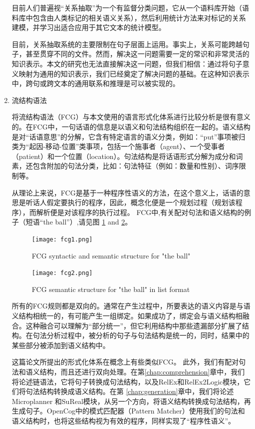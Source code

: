 \begin{enumerate}
目前人们普遍视“关系抽取”为一个有监督分类问题，它从一个语料库开始（语料库中包含由人类标记的相关语义关系），然后利用统计方法来对标记的关系建模，并学习出适合应用于其它文本的统计模型。

目前，关系抽取系统的主要限制在句子层面上运用。事实上，关系可能跨越句子，甚至贯穿不同的文件。然而，解决这一问题需要一定的常识和非常灵活的知识表示。本文的研究也无法直接解决这一问题，但我们相信：通过将句子意义映射为通用的知识表示，我们已经奠定了解决问题的基础。在这种知识表示中，跨句或跨文本的通用联系和推理是可以被实现的。

\item{流结构语法}


将流结构语法（FCG）与本文使用的语言形式化体系进行比较分析是很有意义的。在FCG中，一句话语的信息是以语义和句法结构组织在一起的。语义结构是对“话语意思”的分解，它含有特定语言的语义分类，例如：“put”事项被归类为“起因-移动-位置”类事项，包括一个施事者（agent）、一个受事者（patient）和一个位置（location）。句法结构是将话语形式分解为成分和词素，还包含附加的句法分类，比如：句法特征（例如：数量和性别）、词序限制等。


从理论上来说，FCG是基于一种程序性语义的方法，在这个意义上，话语的意思是听话人假定要执行的程序，因此，概念化便是一个规划过程（规划该程序），而解析便是对该程序的执行过程。
FCG中,有关配对句法和语义结构的例子（短语“the ball”）,请见图 \ref{fig:fcg1} and \ref{fig:fcg2}。

\begin{figure}[htb]
\centering
\texttt{[image: fcg1.png]}
\caption{ FCG syntactic and semantic structure for "the ball" }
\label{fig:fcg1}
\end{figure}

\begin{figure}[htb]
\centering
\texttt{[image: fcg2.png]}
\caption{ FCG semantic structure for "the ball" in  list format}
\label{fig:fcg2}
\end{figure}


所有的FCG规则都是双向的。通常在产生过程中，所要表达的语义内容是与语义结构相统一的，有可能产生一组绑定。如果成功了，绑定会与语义结构相融合。这种融合可以理解为“部分统一”，但它利用结构中那些遗漏部分扩展了结构。在句法分析过程中，被分析的句子与句法结构是统一的，同时，结果中的某些部分被添加到语义结构中。


这篇论文所提出的形式化体系在概念上有些类似FCG。 此外，我们有配对句法和语义结构，而且还进行双向处理。在第\ref{chap:comprehension}章中，我们将论述链语法，它将句子转换成句法结构，以及RelEx和RelEx2Logic模块，它们将句法结构转换成语义结构。在第 \ref{chap:generation}章中，我们将论述Microplanner 和SuReal模块，从另一个方向，将语义结构转换成句法结构，再生成句子。OpenCog中的模式匹配器（Pattern Matcher）使用我们的句法和语义结构时，也将这些结构视为有效的程序，同样实现了“程序性语义”。


\end{enumerate}
